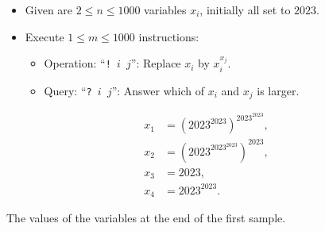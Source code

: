 \begin{frame}
    \frametitle{\problemtitle}

    \begin{columns}
        \begin{column}[T]{.70\textwidth}
            \begin{itemize}
                \item Given are $2\leq n\leq 1000$ variables $x_i$, initially
                  all set to $2023$.
                \item Execute $1\leq m\leq 1000$ instructions:
                  \begin{itemize}
                    \item Operation: ``\texttt{!~$i$~$j$}'': Replace $x_i$ by $x_i^{x_j}$.
                    \item Query: ``\texttt{?~$i$~$j$}'': Answer which of $x_i$
                      and $x_j$ is larger.
                  \end{itemize}
            \end{itemize}

            \centering
            \vspace{1em}
            \newcommand{\x}{{2023}}
            \begin{align*}
              x_1&=\left(\x^\x\right)^{\x^\x},\\
              x_2&=\left(\x^{\x^\x}\right)^\x,\\
              x_3&=\x,\\
              x_4&=\x^\x.
            \end{align*}

            \small The values of the variables at the end of the first sample.
        \end{column}

%
    \end{columns}
\end{frame}
